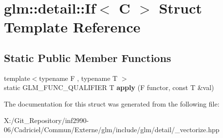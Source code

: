 \hypertarget{structglm_1_1detail_1_1_if}{\section{glm\-:\-:detail\-:\-:If$<$ C $>$ Struct Template Reference}
\label{structglm_1_1detail_1_1_if}
}
\subsection*{Static Public Member Functions}
\begin{DoxyCompactItemize}
\item 
\hypertarget{structglm_1_1detail_1_1_if_ab66c77bac87f7ffe4aa6bb761b165746}{{\footnotesize template$<$typename F , typename T $>$ }\\static G\-L\-M\-\_\-\-F\-U\-N\-C\-\_\-\-Q\-U\-A\-L\-I\-F\-I\-E\-R T {\bfseries apply} (F functor, const T \&val)}\label{structglm_1_1detail_1_1_if_ab66c77bac87f7ffe4aa6bb761b165746}

\end{DoxyCompactItemize}


The documentation for this struct was generated from the following file\-:\begin{DoxyCompactItemize}
\item 
X\-:/\-Git\-\_\-\-Repository/inf2990-\/06/\-Cadriciel/\-Commun/\-Externe/glm/include/glm/detail/\-\_\-vectorize.\-hpp\end{DoxyCompactItemize}
